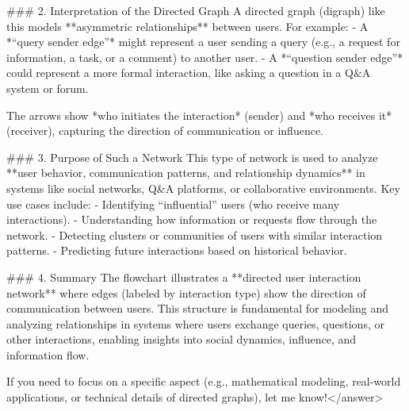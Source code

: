 ### 2. Interpretation of the Directed Graph  
A directed graph (digraph) like this models **asymmetric relationships** between users. For example:  
- A *“query sender edge”* might represent a user sending a query (e.g., a request for information, a task, or a comment) to another user.  
- A *“question sender edge”* could represent a more formal interaction, like asking a question in a Q&A system or forum.  

The arrows show *who initiates the interaction* (sender) and *who receives it* (receiver), capturing the direction of communication or influence.    


### 3. Purpose of Such a Network  
This type of network is used to analyze **user behavior, communication patterns, and relationship dynamics** in systems like social networks, Q&A platforms, or collaborative environments. Key use cases include:  
- Identifying “influential” users (who receive many interactions).  
- Understanding how information or requests flow through the network.  
- Detecting clusters or communities of users with similar interaction patterns.  
- Predicting future interactions based on historical behavior.    


### 4. Summary  
The flowchart illustrates a **directed user interaction network** where edges (labeled by interaction type) show the direction of communication between users. This structure is fundamental for modeling and analyzing relationships in systems where users exchange queries, questions, or other interactions, enabling insights into social dynamics, influence, and information flow.  


If you need to focus on a specific aspect (e.g., mathematical modeling, real-world applications, or technical details of directed graphs), let me know!</answer>